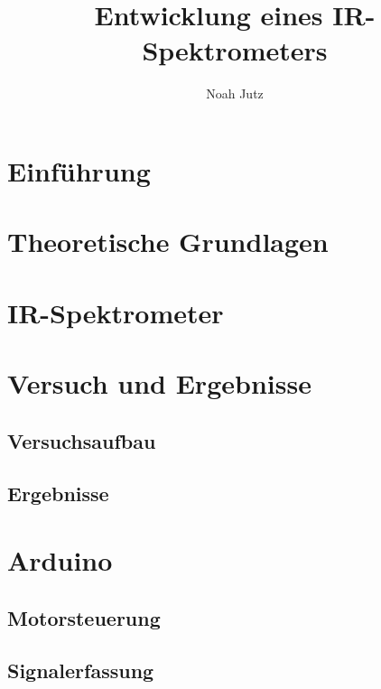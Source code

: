 \documentclass{article}
\title{Entwicklung eines IR-Spektrometers}
\author{Noah Jutz}
\date{}
\begin{document}
\maketitle
\thispagestyle{empty}

\newpage
\tableofcontents
\thispagestyle{empty}

\newpage
{}
\section{Einführung}


\newpage
\section{Theoretische Grundlagen}


\newpage
\section{IR-Spektrometer}


\section{Versuch und Ergebnisse}


\subsection{Versuchsaufbau}


\subsection{Ergebnisse}


\section{Arduino} %

\subsection{Motorsteuerung}

\subsection{Signalerfassung}

\newpage
\printbibliography[heading=bibintoc, keyword={literatur}]
\printbibliography[heading=subbibintoc, keyword={image}, title={Bilder}]

\newpage

\end{document}

